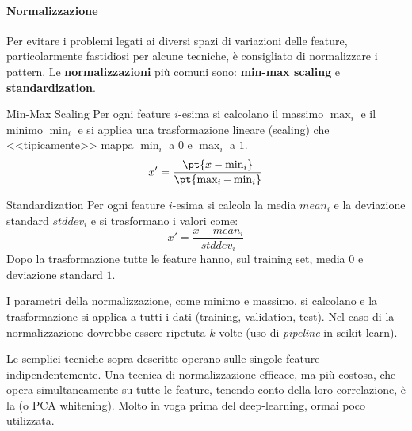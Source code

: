 \paragraph{Normalizzazione}\label{par:normalizzazione} %
Per evitare i problemi legati ai diversi spazi di variazioni delle feature, particolarmente fastidiosi per alcune tecniche, è consigliato di normalizzare i pattern.
Le \textbf{normalizzazioni} più comuni sono: \textbf{min-max scaling} e \textbf{standardization}.
\begin{definition}{Min-Max Scaling}{}
    Per ogni feature $i$-esima si calcolano il massimo $\max_i$ e il minimo $\min_i$ e si applica una trasformazione lineare (scaling) che <<tipicamente>> mappa $\min_i$ a $0$ e $\max_i$ a $1$.
    \[
        x' = \frac{\pt{x - \min_i}}{\pt{\max_i - \min_i}}
    \]
\end{definition}
\begin{definition}{Standardization}{}
    Per ogni feature $i$-esima si calcola la media $mean_i$ e la deviazione standard $stddev_i$ e si trasformano i valori come:
    \[
        x' = \frac{x - mean_i}{stddev_i}
    \]
    Dopo la trasformazione tutte le feature hanno, sul training set, media $0$ e deviazione standard $1$.
\end{definition}
\begin{critical}
    I parametri della normalizzazione, come minimo e massimo, si calcolano \textbf{} e la trasformazione si applica a tutti i dati (training, validation, test).
    Nel caso di  la normalizzazione dovrebbe essere ripetuta $k$ volte (uso di \textit{pipeline} in scikit-learn).
\end{critical}
Le semplici tecniche sopra descritte operano sulle singole feature indipendentemente.
Una tecnica di normalizzazione efficace, ma più costosa, che opera simultaneamente su tutte le feature, tenendo conto della loro correlazione, è la \textbf{} (o PCA whitening).
Molto in voga prima del deep-learning, ormai poco utilizzata.
